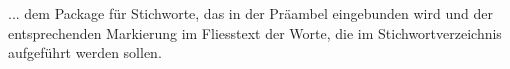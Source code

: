 
... dem Package für Stichworte, das in der Präambel eingebunden wird und der entsprechenden Markierung im Fliesstext der Worte, die im Stichwortverzeichnis aufgeführt werden sollen.
